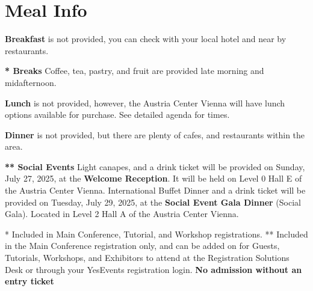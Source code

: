 \chapter{Meal Info}
\vspace*{0.2cm}

\textbf{Breakfast} is not provided, you can check with your local hotel and near by restaurants.

\textbf{* Breaks} Coffee, tea, pastry, and fruit are provided late morning and midafternoon.

\textbf{Lunch} is not provided, however, the Austria Center Vienna will have lunch options available for purchase. See detailed agenda for times. 

\textbf{Dinner} is  not provided, but there are plenty of cafes, and restaurants within the area.

\textbf{** Social Events} 
Light canapes, and a drink ticket will be provided on Sunday, July 27, 2025, at the \textbf{Welcome Reception}. It will be held on Level 0 Hall E of the Austria Center Vienna. 
International Buffet Dinner and a drink ticket will be provided on Tuesday, July 29, 2025, at the \textbf{Social Event Gala Dinner} (Social Gala). Located in Level 2 Hall A of the Austria Center Vienna.

* Included in Main Conference, Tutorial, and Workshop registrations.
** Included in the Main Conference registration only, and can be added on for Guests, Tutorials, Workshops, and Exhibitors to attend at the Registration Solutions Desk or through your YesEvents registration login. \textbf{No admission without an entry ticket}
